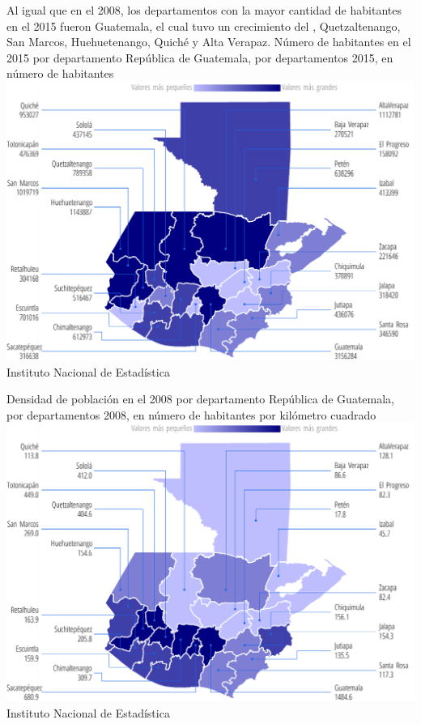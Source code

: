    
    {%
Al igual que en el 2008, los departamentos con la mayor cantidad de habitantes en el 2015 fueron Guatemala, el cual tuvo un crecimiento del , Quetzaltenango, San Marcos, Huehuetenango, Quiché y Alta Verapaz.  }%
    {%
    	Número de habitantes en el 2015 por departamento
    } %
    {%
    	República de Guatemala, por departamentos 2015, en número de habitantes} %
    {%
    	\includegraphics[width=52\cuadri]{graficas/1_02.pdf}}%
    {%
    	Instituto Nacional de Estadística} %
    
    
    
   {%
   }%
   {%
   	Densidad de población en el 2008 por departamento
   } %
   {%
   		República de Guatemala, por departamentos 2008, en número de habitantes por kilómetro cuadrado} %
   {%
   	\includegraphics[width=52\cuadri]{graficas/1_05.pdf}}%
   {%
   	Instituto Nacional de Estadística} %
   
